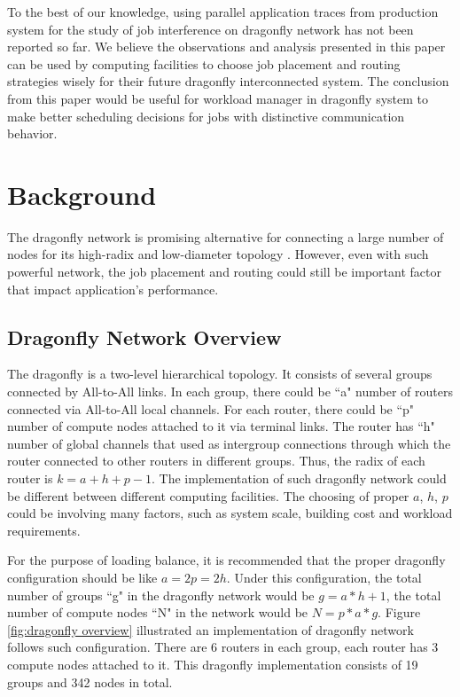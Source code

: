 \documentclass[conference,compsoc]{IEEEtran}
\begin{document}
To the best of our knowledge, using parallel application traces from production system for the study of job interference on dragonfly network has not been reported so far. We believe the observations and analysis presented in this paper can be used by computing facilities to choose job placement and routing strategies wisely for their future dragonfly interconnected system. The conclusion from this paper would be useful for workload manager in dragonfly system to make better scheduling decisions for jobs with distinctive communication behavior.

\section{Background}
\label{sec:background}
The dragonfly network is promising alternative for connecting a large number of nodes for its high-radix and low-diameter topology\cite{dally-dragonfly} \cite{kim-micro} \cite{faanes}. However, even with such powerful network, the job placement and routing could still be important factor that impact application's performance. 


\subsection{Dragonfly Network Overview}
\label{sec:network}
The dragonfly is a two-level hierarchical topology. It consists of several groups connected by All-to-All links. In each group, there could be ``a" number of routers connected via All-to-All local channels. For each router, there could be ``p" number of compute nodes attached to it via terminal links. The router has ``h" number of global channels that used as intergroup connections through which the router connected to other routers in different groups. Thus, the radix of each router is $k = a+h+p-1$. The implementation of such dragonfly network could be different between different computing facilities. The choosing of proper $a$, $h$, $p$ could be involving many factors, such as system scale, building cost and workload requirements. 

For the purpose of loading balance, it is recommended that the proper dragonfly configuration should be like $a=2p=2h$\cite{kim-micro}. Under this configuration, the total number of groups ``g" in the dragonfly network would be $g = a*h+1 $, the total number of compute nodes ``N" in the network would be $N = p*a*g $. Figure \ref{fig:dragonfly overview} illustrated an implementation of dragonfly network follows such configuration. There are 6 routers in each group, each router has 3 compute nodes attached to it. This dragonfly implementation consists of 19 groups and 342 nodes in total.
\end{document}
